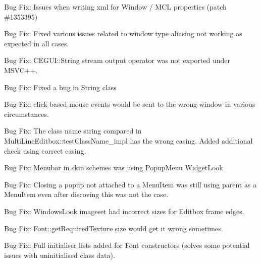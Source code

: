 \begin{DoxyItemize}
\item Bug Fix\+: Issues when writing xml for Window / M\+CL properties (patch \#1353395)
\item Bug Fix\+: Fixed various issues related to window type aliasing not working as expected in all cases.
\item Bug Fix\+: C\+E\+G\+U\+I\+::\+String stream output operator was not exported under M\+S\+V\+C++.
\item Bug Fix\+: Fixed a bug in String class
\item Bug Fix\+: \textquotesingle{}click\textquotesingle{} based mouse events would be sent to the wrong window in various circumstances.
\item Bug Fix\+: The class name string compared in Multi\+Line\+Editbox\+::test\+Class\+Name\+\_\+impl has the wrong casing. Added additional check using correct casing.
\item Bug Fix\+: Menubar in skin schemes was using Popup\+Menu Widget\+Look
\item Bug Fix\+: Closing a popup not attached to a Menu\+Item was still using parent as a Menu\+Item even after discoving this was not the case.
\item Bug Fix\+: Windows\+Look imageset had incorrect sizes for Editbox frame edges.
\item Bug Fix\+: Font\+::get\+Required\+Texture size would get it wrong sometimes.
\item Bug Fix\+: Full initialiser lists added for Font constructors (solves some potential issues with uninitialised class data).
\end{DoxyItemize}

